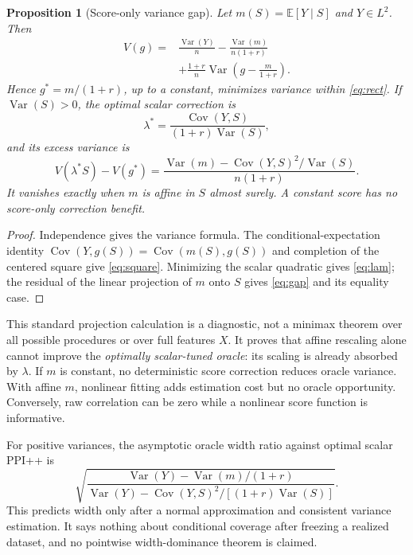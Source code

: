\documentclass{article}
\newtheorem{proposition}{Proposition}
\newcommand{\E}{\mathbb{E}}
\newcommand{\V}{\operatorname{Var}}
\newcommand{\Cov}{\operatorname{Cov}}
\begin{document}
\begin{proposition}[Score-only variance gap]\label{prop:gap}
Let $m(S)=\E[Y\mid S]$ and $Y\in L^2$. Then
\begin{align}\label{eq:square}
V(g)={}&\frac{\V(Y)}n-\frac{\V(m)}{n(1+r)}\\
&+\frac{1+r}{n}\V\left(g-\frac{m}{1+r}\right).\nonumber
\end{align}
Hence $g^*=m/(1+r)$, up to a constant, minimizes variance within \cref{eq:rect}. If $\V(S)>0$, the optimal scalar correction is
\begin{equation}\label{eq:lam}
\lambda^*=\frac{\Cov(Y,S)}{(1+r)\V(S)},
\end{equation}
and its excess variance is
\begin{equation}\label{eq:gap}
V(\lambda^*S)-V(g^*)=
\frac{\V(m)-\Cov(Y,S)^2/\V(S)}{n(1+r)}.
\end{equation}
It vanishes exactly when $m$ is affine in $S$ almost surely. A constant score has no score-only correction benefit.
\end{proposition}
\begin{proof}
Independence gives the variance formula. The conditional-expectation identity $\Cov(Y,g(S))=\Cov(m(S),g(S))$ and completion of the centered square give \cref{eq:square}. Minimizing the scalar quadratic gives \cref{eq:lam}; the residual of the linear projection of $m$ onto $S$ gives \cref{eq:gap} and its equality case.
\end{proof}

This standard projection calculation is a diagnostic, not a minimax theorem over all possible procedures or over full features $X$. It proves that affine rescaling alone cannot improve the \emph{optimally scalar-tuned oracle}: its scaling is already absorbed by $\lambda$. If $m$ is constant, no deterministic score correction reduces oracle variance. With affine $m$, nonlinear fitting adds estimation cost but no oracle opportunity. Conversely, raw correlation can be zero while a nonlinear score function is informative.

For positive variances, the asymptotic oracle width ratio against optimal scalar PPI++ is
\begin{equation}\label{eq:widthratio}
\sqrt{\frac{\V(Y)-\V(m)/(1+r)}
{\V(Y)-\Cov(Y,S)^2/[(1+r)\V(S)]}}.
\end{equation}
This predicts width only after a normal approximation and consistent variance estimation. It says nothing about conditional coverage after freezing a realized dataset, and no pointwise width-dominance theorem is claimed.
\end{document}
